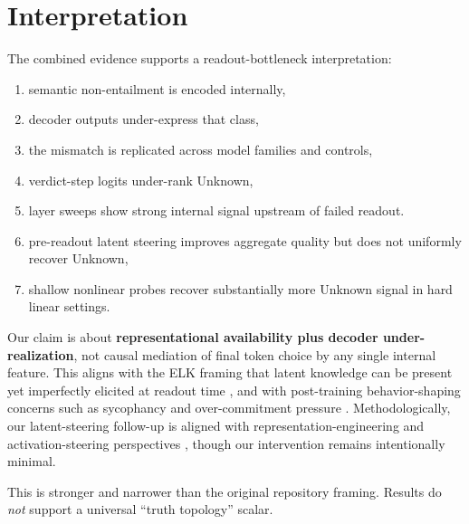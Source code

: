 \documentclass[11pt]{article}
\begin{document}
\section{Interpretation}
The combined evidence supports a readout-bottleneck interpretation:
\begin{enumerate}
  \item semantic non-entailment is encoded internally,
  \item decoder outputs under-express that class,
  \item the mismatch is replicated across model families and controls,
  \item verdict-step logits under-rank Unknown,
  \item layer sweeps show strong internal signal upstream of failed readout.
  \item pre-readout latent steering improves aggregate quality but does not uniformly recover Unknown,
  \item shallow nonlinear probes recover substantially more Unknown signal in hard linear settings.
\end{enumerate}

Our claim is about \textbf{representational availability plus decoder under-realization}, not causal mediation of final token choice by any single internal feature.
This aligns with the ELK framing that latent knowledge can be present yet imperfectly elicited at readout time \cite{hubinger2021elk,burns2022discovering}, and with post-training behavior-shaping concerns such as sycophancy and over-commitment pressure \cite{sharma2023sycophancy}.
Methodologically, our latent-steering follow-up is aligned with representation-engineering and activation-steering perspectives \cite{zou2023repe,turner2023actadd}, though our intervention remains intentionally minimal.

This is stronger and narrower than the original repository framing.
Results do \emph{not} support a universal ``truth topology'' scalar.
\end{document}
